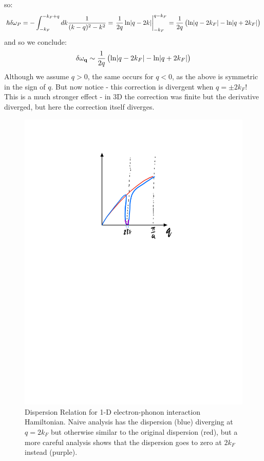 so:
\begin{equation}
    \hbar \delta \omega_P =  -\int_{-k_F}^{-k_F + q}dk \frac{1}{(k - q)^2 - k^2} = \left.\frac{1}{2q}\ln\lvert q - 2k \rvert\right|_{-k_F}^{q - k_F} = \frac{1}{2q}\left(\ln\lvert q - 2k_F \rvert - \ln\lvert q + 2k_F \rvert\right)
\end{equation}
and so we conclude:
\begin{equation}
    \delta \omega_{\mathbf{q}} \sim \frac{1}{2q}\left(\ln\lvert q - 2k_F \rvert - \ln\lvert q + 2k_F \rvert\right)
\end{equation}
Although we assume $q > 0$, the same occurs for $q < 0$, as the above is symmetric in the sign of $q$. But now notice - this correction is divergent when $q = \pm 2k_F$! This is a much stronger effect - in 3D the correction was finite but the derivative diverged, but here the correction itself diverges.

\begin{figure}[htbp]
    \centering
    \includegraphics[scale=0.7]{Images/fig-peirelsdispersion.pdf}
    \caption{Dispersion Relation for 1-D electron-phonon interaction Hamiltonian. Naive analysis has the dispersion (blue) diverging at $q = 2k_F$ but otherwise similar to the original dispersion (red), but a more careful analysis shows that the dispersion goes to zero at $2k_F$ instead (purple).}
    \label{fig-peirelsdispersion}
\end{figure}

